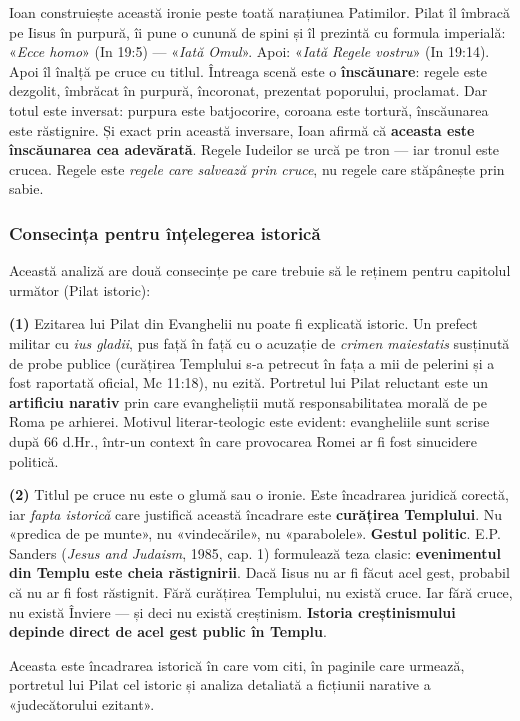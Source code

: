 \documentclass[12pt,a4paper,twoside,openany]{book}
\begin{document}
Ioan construiește această ironie peste toată narațiunea Patimilor. Pilat îl îmbracă pe Iisus în purpură, îi pune o cunună de spini și îl prezintă cu formula imperială: «\textit{Ecce homo}» (In 19:5) — «\textit{Iată Omul}». Apoi: «\textit{Iată Regele vostru}» (In 19:14). Apoi îl înalță pe cruce cu titlul. Întreaga scenă este o \textbf{înscăunare}: regele este dezgolit, îmbrăcat în purpură, încoronat, prezentat poporului, proclamat. Dar totul este inversat: purpura este batjocorire, coroana este tortură, înscăunarea este răstignire. Și exact prin această inversare, Ioan afirmă că \textbf{aceasta este înscăunarea cea adevărată}. Regele Iudeilor se urcă pe tron — iar tronul este crucea. Regele este \textit{regele care salvează prin cruce}, nu regele care stăpânește prin sabie.

\subsubsection*{Consecința pentru înțelegerea istorică}

Această analiză are două consecințe pe care trebuie să le reținem pentru capitolul următor (Pilat istoric):

\textbf{(1)} Ezitarea lui Pilat din Evanghelii nu poate fi explicată istoric. Un prefect militar cu \textit{ius gladii}, pus față în față cu o acuzație de \textit{crimen maiestatis} susținută de probe publice (curățirea Templului s-a petrecut în fața a mii de pelerini și a fost raportată oficial, Mc 11:18), nu ezită. Portretul lui Pilat reluctant este un \textbf{artificiu narativ} prin care evangheliștii mută responsabilitatea morală de pe Roma pe arhierei. Motivul literar-teologic este evident: evangheliile sunt scrise după 66 d.Hr., într-un context în care provocarea Romei ar fi fost sinucidere politică.

\textbf{(2)} Titlul pe cruce nu este o glumă sau o ironie. Este încadrarea juridică corectă, iar \textit{fapta istorică} care justifică această încadrare este \textbf{curățirea Templului}. Nu «predica de pe munte», nu «vindecările», nu «parabolele». \textbf{Gestul politic}. E.P. Sanders (\textit{Jesus and Judaism}, 1985, cap. 1) formulează teza clasic: \textbf{evenimentul din Templu este cheia răstignirii}. Dacă Iisus nu ar fi făcut acel gest, probabil că nu ar fi fost răstignit. Fără curățirea Templului, nu există cruce. Iar fără cruce, nu există Înviere — și deci nu există creștinism. \textbf{Istoria creștinismului depinde direct de acel gest public în Templu}.

Aceasta este încadrarea istorică în care vom citi, în paginile care urmează, portretul lui Pilat cel istoric și analiza detaliată a ficțiunii narative a «judecătorului ezitant».
\end{document}
